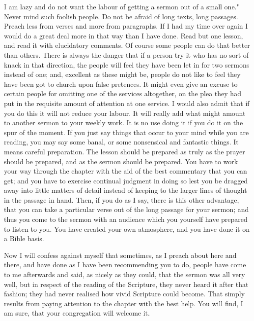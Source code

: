 \documentclass[12pt,letterpaper,oneside]{book}
\begin{document}
I am lazy and do not want the labour of getting 
a sermon out of a small one." Never mind such 
foolish people. Do not be afraid of long texts, 
long passages. Preach less from verses and 
more from paragraphs. If I had my time over 
again I would do a great deal more in that way 
than I have done. Read but one lesson, and read 
it with elucidatory comments. Of course some 
people can do that better than others. There 
is always the danger that if a person try it who 
has no sort of knack in that direction, the people 
will feel they have been let in for two sermons 
instead of one; and, excellent as these might 
be, people do not like to feel they have been got 
to church upon false pretences. It might even 
give an excuse to certain people for omitting 
one of the services altogether, on the plea they 
had put in the requisite amount of attention at 
one service. I would also admit that if you do 
this it will not reduce your labour. It will really 
add what might amount to another sermon to 
your weekly work. It is no use doing it if you 
do it on the spur of the moment. If you just say 
things that occur to your mind while you are 
reading, you may say some banal, or some nonsensical 
and fantastic things. It means careful 
preparation. The lesson should be prepared as 
truly as the prayer should be prepared, and as 
the sermon should be prepared. You have to 
work your way through the chapter with the 
aid of the best commentary that you can get; 
and you have to exercise continual judgment in 
doing so lest you be dragged away into little 
matters of detail instead of keeping to the 
larger lines of thought in the passage in hand. 
Then, if you do as I say, there is this other 
advantage, that you can take a particular verse 
out of the long passage for your sermon; and 
thus you come to the sermon with an audience 
which you yourself have prepared to listen to 
you. You have created your own atmosphere, 
and you have done it on a Bible basis. 

Now I will confess against myself that sometimes, 
as I preach about here and there, and 
have done as I have been recommending you to 
do, people have come to me afterwards and said, 
as nicely as they could, that the sermon was all 
very well, but in respect of the reading of the 
Scripture, they never heard it after that fashion; 
they had never realised how vivid Scripture 
could become. That simply results from paying 
attention to the chapter with the best help. 
You will find, I am sure, that your congregation 
will welcome it.
\end{document}
